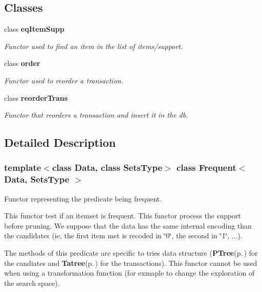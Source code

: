 \subsection*{Classes}
\begin{CompactItemize}
\item 
class {\bf eq\-Item\-Supp}
\begin{CompactList}\small\item\em Functor used to find an item in the list of items/support. \item\end{CompactList}\item 
class {\bf order}
\begin{CompactList}\small\item\em Functor used to reorder a transaction. \item\end{CompactList}\item 
class {\bf reorder\-Trans}
\begin{CompactList}\small\item\em Functor that reorders a transaction and insert it in the db. \item\end{CompactList}\end{CompactItemize}


\subsection{Detailed Description}
\subsubsection*{template$<$class Data, class Sets\-Type$>$ class Frequent$<$ Data, Sets\-Type $>$}

Functor representing the predicate being frequent. 

This functor test if an itemset is frequent. This functor process the support before pruning. We suppose that the data has the same internal encoding than the candidates (ie, the first item met is recoded in \char`\"{}0\char`\"{}, the second in \char`\"{}1\char`\"{}, ...).

The methods of this predicate are specific to tries data structure ({\bf PTree}{\rm (p.\,\pageref{class_p_tree})} for the candiates and {\bf Tatree}{\rm (p.\,\pageref{class_tatree})} for the transactions). This functor cannot be used when using a transformation function (for exmaple to change the exploration of the search space).

